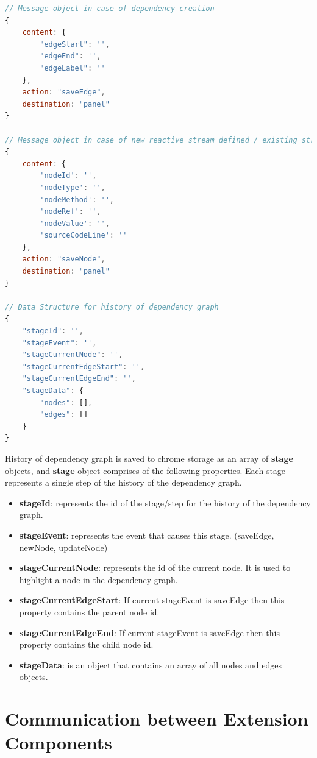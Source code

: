 \begin{lstlisting}[language=JavaScript, caption=Significant Data Structures used by CRI, label={lst:imp_sig_data_structs}]
// Message object in case of dependency creation
{
	content: {
		"edgeStart": '',
		"edgeEnd": '',
		"edgeLabel": ''
	},
	action: "saveEdge",
	destination: "panel"
}

// Message object in case of new reactive stream defined / existing stream gets a new value
{
	content: {
		'nodeId': '',
		'nodeType': '',
		'nodeMethod': '',
		'nodeRef': '',
		'nodeValue': '',
		'sourceCodeLine': ''
	},
	action: "saveNode",
	destination: "panel"
}

// Data Structure for history of dependency graph
{
	"stageId": '',
	"stageEvent": '',
	"stageCurrentNode": '',
	"stageCurrentEdgeStart": '',
	"stageCurrentEdgeEnd": '',
	"stageData": {
		"nodes": [],
		"edges": []
	}
}
\end{lstlisting}

History of dependency graph is saved to chrome storage as an array of \textbf{stage} objects, and \textbf{stage} object comprises of the following properties. Each stage represents a single step of the history of the dependency graph.\\
\begin{itemize}
\item \textbf{stageId}: represents the id of the stage/step for the history of the dependency graph.
\item \textbf{stageEvent}: represents the event that causes this stage. (saveEdge, newNode, updateNode)
\item \textbf{stageCurrentNode}: represents the id of the current node. It is used to highlight a node in the dependency graph.
\item \textbf{stageCurrentEdgeStart}: If current stageEvent is saveEdge then this property contains the parent node id.
\item \textbf{stageCurrentEdgeEnd}: If current stageEvent is saveEdge then this property contains the child node id.
\item \textbf{stageData}: is an object that contains an array of all nodes and edges objects.
\end{itemize}

\section{Communication between Extension Components}

